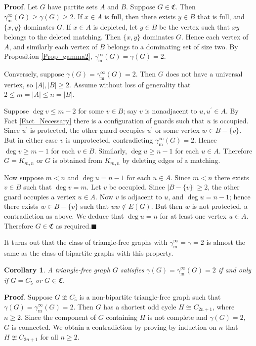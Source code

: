 \documentclass[12pt]{article}%
\newtheorem{corollary}[theorem]{Corollary}
\begin{document}
\noindent\textbf{Proof}.\hspace{0.1in} Let $G$ have partite sets $A$ and $B$.
Suppose $G\in\mathfrak{C}$. Then $\gamma_{\mathrm{m}}^{\infty}(G)\geq
\gamma(G)\geq2$. If $x\in A$ is full, then there exists $y\in B$ that is full,
and $\{x,y\}$ dominates $G$. If $x\in A$ is depleted, let $y\in B$ be the
vertex such that $xy$ belongs to the deleted matching. Then $\{x,y\}$
dominates $G$. Hence each vertex of $A$, and similarly each vertex of $B$
belongs to a dominating set of size two. By Proposition \ref{Prop_gamma2},
$\gamma_{\mathrm{m}}^{\infty}(G)=\gamma(G)=2$.

Conversely, suppose $\gamma(G)=\gamma_{\mathrm{m}}^{\infty}(G)=2$. Then $G$
does not have a universal vertex, so $|A|,|B|\geq2$. Assume without loss of
generality that $2\leq m=|A|\leq n=|B|$.

Suppose $\deg v\leq m-2$ for some $v\in B$; say $v$ is nonadjacent to
$u,u^{\prime}\in A$. By Fact \ref{Fact_Necessary} there is a configuration of
guards such that $u$ is occupied. Since $u^{\prime}$ is protected, the other
guard occupies $u^{\prime}$ or some vertex $w\in B-\{v\}$. But in either case
$v$ is unprotected, contradicting $\gamma_{\mathrm{m}}^{\infty}(G)=2$. Hence
$\deg v\geq m-1$ for each $v\in B$. Similarly, $\deg u\geq n-1$ for each $u\in
A$. Therefore $G=K_{m,n}$ or $G$ is obtained from $K_{m,n}$ by deleting edges
of a matching.

Now suppose $m<n$ and $\deg u=n-1$ for each $u\in A$. Since $m<n$ there exists
$v\in B$ such that $\deg v=m$. Let $v$ be occupied. Since $|B-\{v\}|\geq2$,
the other guard occupies a vertex $u\in A$. Now $v$ is adjacent to $u$, and
$\deg u=n-1$; hence there exists $w\in B-\{v\}$ such that $uw\notin E(G)$. But
then $w$ is not protected, a contradiction as above. We deduce that $\deg u=n$
for at least one vertex $u\in A$. Therefore $G\in\mathfrak{C}$ as
required.\hfill$\blacksquare$

\bigskip

It turns out that the class of triangle-free graphs with $\gamma_{\mathrm{m}%
}^{\infty}=\gamma=2$ is almost the same as the class of bipartite graphs with
this property.

\begin{corollary}
\label{CorTriangle-free}A triangle-free graph $G$ satisfies $\gamma
(G)=\gamma_{\mathrm{m}}^{\infty}(G)=2$ if and only if $G=C_{5}$ or
$G\in\mathfrak{C}$.
\end{corollary}

\noindent\textbf{Proof}.\hspace{0.1in} Suppose $G\ncong C_{5}$ is a
non-bipartite triangle-free graph such that $\gamma(G)=\gamma_{\mathrm{m}%
}^{\infty}(G)=2$. Then $G$ has a shortest odd cycle $H\cong C_{2n+1}$, where
$n\geq2$. Since the component of $G$ containing $H$ is not complete and
$\gamma(G)=2$, $G$ is connected. We obtain a contradiction by proving by
induction on $n$ that $H\ncong C_{2n+1}$ for all $n\geq2$.
\end{document}
